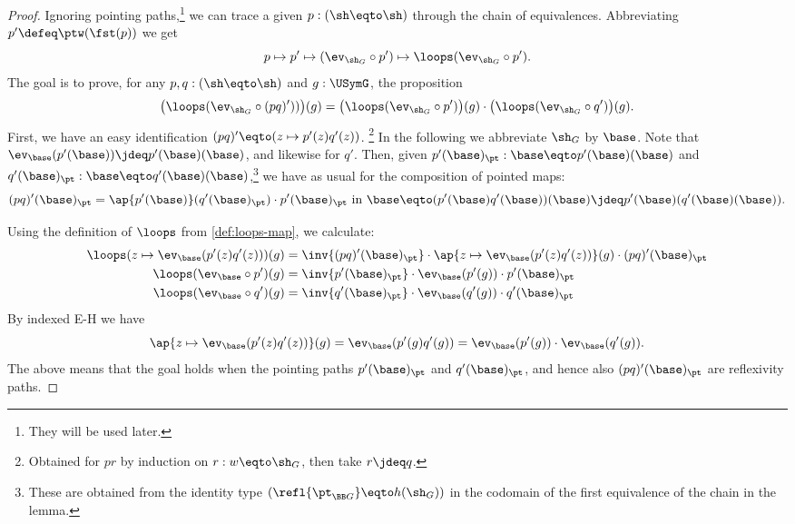 \begin{proof}
Ignoring pointing paths,\footnote{They will be used later.} 
we can trace a given $p:(\sh\eqto\sh)$ through 
the chain of equivalences. Abbreviating $p' \defeq \ptw(\fst(p))$ we get
\[ 
p \mapsto 
p' \mapsto 
(\ev_{\sh_G}\circ p') \mapsto 
\loops(\ev_{\sh_G}\circ p').
\]
The goal is to prove, for any $p,q:(\sh\eqto\sh)$ and $g:\USymG$, 
the proposition
\[
\bigl(\loops(\ev_{\sh_G}\circ (pq)'))\bigr)(g) = 
\bigl(\loops(\ev_{\sh_G}\circ p')\bigr)(g)\cdot
\bigl(\loops(\ev_{\sh_G}\circ q')\bigr)(g).
\]
First, we have an easy identification $(pq)'\eqto(z\mapsto p'(z)q'(z))$.%
\footnote{Obtained for $pr$ by induction on $r:w\eqto\sh_G$, 
then take $r\jdeq q$.}
In the following we abbreviate $\sh_G$ by $\base$. 
Note that
$\ev_\base(p'(\base))\jdeq p'(\base)(\base)$, and likewise for $q'$.
Then, given $p'(\base)_\pt: \base \eqto p'(\base)(\base)$
and $q'(\base)_\pt : \base \eqto q'(\base)(\base)$,\footnote{%
These are obtained from the identity type $(\refl{\pt_{\BB G}}\eqto h(\sh_G))$
in the codomain of the first equivalence of the chain in the lemma.}
we have as usual for the composition of pointed maps:
\[
(pq)'(\base)_\pt = \ap{p'(\base)}(q'(\base)_\pt)\cdot p'(\base)_\pt \text{~in~} 
\base \eqto (p'(\base)q'(\base))(\base) \jdeq p'(\base)(q'(\base)(\base)).
\]

Using the definition of $\loops$ from \cref{def:loops-map},
we calculate:
\begin{align*}
\loops(z\mapsto \ev_{\base}(p'(z)q'(z)))(g) &= 
\inv{(pq)'(\base)_\pt}\cdot \ap{z\mapsto \ev_{\base}(p'(z)q'(z))}(g) \cdot {(pq)'(\base)_\pt}\\
\loops(\ev_{\base}\circ p')(g) &= 
\inv{p'(\base)_\pt} \cdot \ev_{\base}(p'(g)) \cdot {p'(\base)_\pt}\\
\loops(\ev_{\base}\circ q')(g) &= 
\inv{q'(\base)_\pt} \cdot \ev_{\base}(q'(g)) \cdot {q'(\base)_\pt}
\end{align*}
By indexed E-H we have 
\[
\ap{z\mapsto \ev_{\base}(p'(z)q'(z))}(g) = \ev_{\base}(p'(g)q'(g)) =
\ev_{\base}(p'(g))\cdot\ev_{\base}(q'(g)).
\]
The above means that the goal holds when the pointing paths $p'(\base)_\pt$
and $q'(\base)_\pt$, and hence also $(pq)'(\base)_\pt$ are reflexivity paths.
\end{proof}

